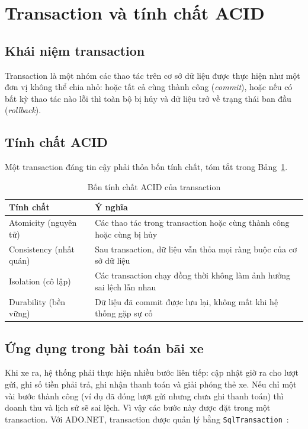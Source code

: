 \section{Transaction và tính chất ACID}
\label{sec:transaction}

\subsection{Khái niệm transaction}

Transaction là một nhóm các thao tác trên cơ sở dữ liệu được thực hiện như một đơn vị không thể chia nhỏ: hoặc tất cả cùng thành công (\textit{commit}), hoặc nếu có bất kỳ thao tác nào lỗi thì toàn bộ bị hủy và dữ liệu trở về trạng thái ban đầu (\textit{rollback}).

\subsection{Tính chất ACID}

Một transaction đáng tin cậy phải thỏa bốn tính chất, tóm tắt trong Bảng~\ref{tab:acid}.

\begin{table}[h]
  \centering
  \begin{tabular}{@{}lp{10cm}@{}}
    \toprule
    \textbf{Tính chất} & \textbf{Ý nghĩa} \\
    \midrule
    Atomicity (nguyên tử) & Các thao tác trong transaction hoặc cùng thành công hoặc cùng bị hủy \\
    Consistency (nhất quán) & Sau transaction, dữ liệu vẫn thỏa mọi ràng buộc của cơ sở dữ liệu \\
    Isolation (cô lập) & Các transaction chạy đồng thời không làm ảnh hưởng sai lệch lẫn nhau \\
    Durability (bền vững) & Dữ liệu đã commit được lưu lại, không mất khi hệ thống gặp sự cố \\
    \bottomrule
  \end{tabular}
  \caption{Bốn tính chất ACID của transaction}
  \label{tab:acid}
\end{table}

\subsection{Ứng dụng trong bài toán bãi xe}

Khi xe ra, hệ thống phải thực hiện nhiều bước liên tiếp: cập nhật giờ ra cho lượt gửi, ghi số tiền phải trả, ghi nhận thanh toán và giải phóng thẻ xe. Nếu chỉ một vài bước thành công (ví dụ đã đóng lượt gửi nhưng chưa ghi thanh toán) thì doanh thu và lịch sử sẽ sai lệch. Vì vậy các bước này được đặt trong một transaction. Với ADO.NET, transaction được quản lý bằng \texttt{SqlTransaction}~\cite{msdocs_sqltransaction}:

